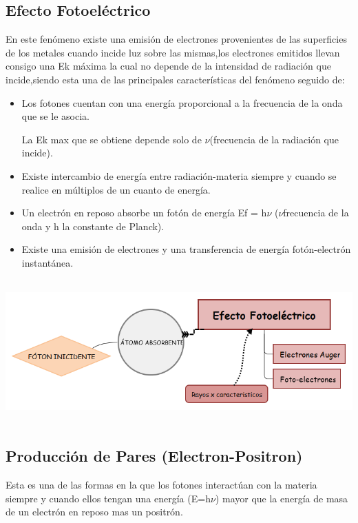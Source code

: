 \documentclass[12pt,fleqn]{book} %
\numberwithin{equation}{section} %
\numberwithin{figure}{section} %
\numberwithin{table}{section} %
\begin{document}
\subsection*{Efecto Fotoeléctrico}
En este fenómeno existe una emisión de electrones provenientes de las superficies de los metales cuando incide luz sobre las mismas,los electrones emitidos llevan consigo una Ek máxima la cual no depende  
de la intensidad de radiación que incide,siendo esta una de las principales características del fenómeno seguido de:

\begin{itemize}
 \item Los fotones cuentan con una energía proporcional a la frecuencia de la onda que se le asocia.
 
 La Ek max que se obtiene depende solo de $\nu$(frecuencia de la radiación que incide).
 \item Existe intercambio de energía entre radiación-materia siempre y cuando se realice en múltiplos de un cuanto de energía.
 \item Un electrón en reposo absorbe un fotón de energía Ef = h$\nu$ ($\nu$frecuencia de la onda y h la constante de Planck). 
 
 \item Existe una emisión de electrones y una transferencia de energía fotón-electrón instantánea.
\end{itemize}

\begin{center}
\includegraphics[height=5.5cm]{ef}
\end{center}


\subsection*{Producción de Pares (Electron-Positron)}

Esta es una de las formas en la que los fotones interactúan con la materia siempre y cuando ellos tengan una energía (E=h$\nu$) mayor que la energía de masa de un electrón en reposo mas  un positrón.
\end{document}

